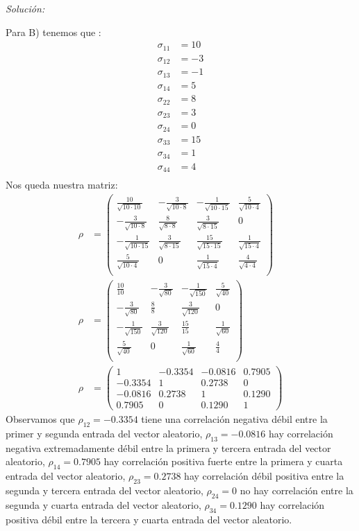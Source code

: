 \documentclass[12pt]{article}
\newenvironment{sol}
    {\emph{Solución:}
    }
    {
    }
\begin{document}
\begin{sol}
Para B) tenemos que :
\begin{align*}
\sigma_{11} &= 10\\
\sigma_{12} &= -3\\
\sigma_{13} &= -1\\
\sigma_{14} &= 5\\
\sigma_{22} &= 8\\
\sigma_{23} &= 3\\
\sigma_{24} &= 0\\
\sigma_{33} &= 15\\
\sigma_{34} &= 1\\
\sigma_{44} &= 4\\
\end{align*}
Nos queda nuestra matriz: 
\begin{align*}
\rho &=
\begin{pmatrix}
\frac{10}{\sqrt{10 \cdot 10}} & -\frac{3}{\sqrt{10 \cdot 8}} & -\frac{1}{\sqrt{10 \cdot 15}} & \frac{5}{\sqrt{10 \cdot 4}} \\
-\frac{3}{\sqrt{10 \cdot 8}} & \frac{8}{\sqrt{8 \cdot 8}} & \frac{3}{\sqrt{8 \cdot 15}} & 0 \\
 -\frac{1}{\sqrt{10 \cdot 15}} & \frac{3}{\sqrt{8 \cdot 15}} & \frac{15}{\sqrt{15 \cdot 15}} & \frac{1}{\sqrt{15 \cdot 4}} \\
 \frac{5}{\sqrt{10 \cdot 4}} &0 &\frac{1}{\sqrt{15 \cdot 4}}  & \frac{4}{\sqrt{4 \cdot 4}} \\
\end{pmatrix}\\
\rho &= 
\begin{pmatrix}
\frac{10}{10} & -\frac{3}{\sqrt{80}}& -\frac{1}{\sqrt{150}}& \frac{5}{\sqrt{40}} \\
-\frac{3}{\sqrt{80}} & \frac{8}{8}& \frac{3}{\sqrt{120}}& 0\\
-\frac{1}{\sqrt{150}} & \frac{3}{\sqrt{120}}& \frac{15}{15}& \frac{1}{\sqrt{60}}\\
\frac{5}{\sqrt{40}} & 0& \frac{1}{\sqrt{60}}& \frac{4}{4}\\
\end{pmatrix}\\
\rho &=
\begin{pmatrix}
1 & -0.3354 & -0.0816 & 0.7905 \\ 
-0.3354 & 1 & 0.2738 & 0 \\ 
-0.0816 & 0.2738 & 1 & 0.1290 \\
0.7905 & 0 & 0.1290 & 1
\end{pmatrix} 
\end{align*}
Observamos que $\rho_{12} = -0.3354$ tiene una correlación negativa débil entre la primer y segunda entrada del vector aleatorio, $\rho_{13}=-0.0816$ hay correlación negativa extremadamente débil entre la primera y tercera entrada del vector aleatorio, $\rho_{14}=0.7905$ hay correlación positiva fuerte entre la primera y cuarta entrada del vector aleatorio, $\rho_{23}=0.2738$ hay correlación débil positiva entre la segunda y tercera entrada del vector aleatorio, $\rho_{24}=0$ no hay correlación entre la segunda y cuarta entrada del vector aleatorio, $\rho_{34}=0.1290$ hay correlación positiva débil entre la tercera y cuarta entrada del vector aleatorio.
\end{sol}
\end{document}
